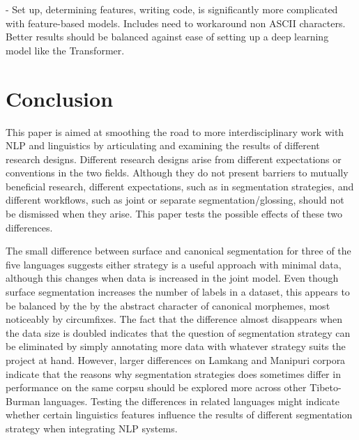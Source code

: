 - Set up, determining features, writing code, is significantly more complicated with feature-based models. Includes need to workaround non ASCII characters. Better results should be balanced against ease of setting up a deep learning model like the Transformer. 


\section{Conclusion}
\label{sec:sgconclusion}

This paper is aimed at smoothing the road to more interdisciplinary work with NLP and linguistics by articulating and examining the results of different research designs. Different research designs arise from different expectations or conventions in the two fields. Although they do not present barriers to mutually beneficial research, different expectations, such as in segmentation strategies, and different workflows, such as joint or separate segmentation/glossing, should not be dismissed when they arise. This paper tests the possible effects of these two differences.

The small difference between surface and canonical segmentation for three of the five languages suggests either strategy is a useful approach with minimal data, although this changes when data is increased in the joint model. Even though surface segmentation increases the number of labels in a dataset, this appears to be balanced by the by the abstract character of canonical morphemes, most noticeably by circumfixes. The fact that the difference almost disappears when the data size is doubled indicates that the question of segmentation strategy can be eliminated by simply annotating more data with whatever strategy suits the project at hand. 
However, larger differences on Lamkang and Manipuri corpora indicate that the reasons why segmentation strategies does sometimes differ in performance on the same corpsu should be explored more across other Tibeto-Burman languages. Testing the differences in related languages might indicate whether certain linguistics features influence the results of different segmentation strategy when integrating NLP systems. 

